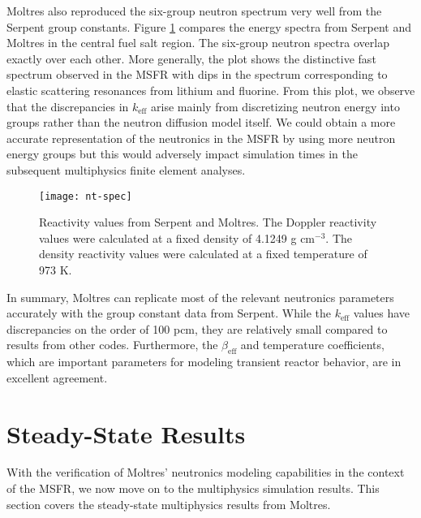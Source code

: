 Moltres also reproduced the six-group neutron spectrum very well from the
Serpent group constants. Figure \ref{fig:ntspec} compares the energy spectra
from Serpent and Moltres in the central fuel salt region. The six-group
neutron spectra overlap exactly over each other. More generally, the plot
shows the distinctive fast spectrum observed in the \gls{MSFR} with dips in
the spectrum corresponding to elastic scattering resonances from lithium and
fluorine. From this plot, we observe that the discrepancies in
$k_{\text{eff}}$ arise mainly from discretizing neutron energy into groups
rather than the neutron diffusion model itself. We could obtain a more
accurate representation of the neutronics in the \gls{MSFR} by using more
neutron energy groups but this would adversely impact simulation times in the
subsequent multiphysics finite element analyses.

\begin{figure}[htb!]
    \centering
    \texttt{[image: nt-spec]}
    \caption{Reactivity values from Serpent and Moltres. The Doppler
    reactivity values were calculated at a fixed density of 4.1249 g
    cm$^{-3}$. The density reactivity values were calculated at a fixed
    temperature of 973 K.}
    \label{fig:ntspec}
\end{figure}

In summary, Moltres can replicate most of the relevant neutronics parameters
accurately with the group constant data from Serpent. While the
$k_{\text{eff}}$ values have discrepancies on the order of 100 pcm, they are
relatively small compared to results from other codes. Furthermore, the
$\beta_{\text{eff}}$ and temperature coefficients, which are important
parameters for modeling transient reactor behavior, are in excellent
agreement.

\section{Steady-State Results}

With the verification of Moltres' neutronics modeling capabilities in the
context of the \gls{MSFR}, we now move on to the multiphysics simulation
results. This section covers the steady-state multiphysics results from
Moltres.

